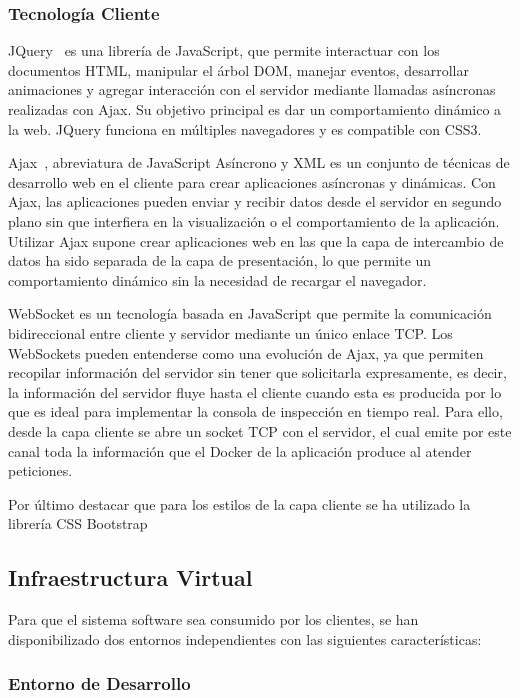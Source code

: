 \documentclass[a4paper,11pt]{book}
\begin{document}
\subsubsection{Tecnología Cliente}


JQuery~\cite{jq} es una librería de JavaScript, que permite interactuar con los documentos HTML, manipular el árbol DOM, manejar eventos, desarrollar animaciones y agregar interacción con el servidor mediante llamadas asíncronas realizadas con Ajax. Su objetivo principal es dar un comportamiento dinámico a la web. JQuery funciona en múltiples navegadores y es compatible con CSS3.

Ajax~\cite{aj}, abreviatura de JavaScript Asíncrono y XML es un conjunto de técnicas de desarrollo web en el cliente para crear aplicaciones asíncronas y dinámicas. Con Ajax, las aplicaciones pueden enviar y recibir datos desde el servidor en segundo plano sin que interfiera en la visualización o el comportamiento de la aplicación. Utilizar Ajax supone crear aplicaciones web en las que la capa de intercambio de datos ha sido separada de la capa de presentación, lo que permite un comportamiento dinámico sin la necesidad de recargar el navegador.


WebSocket es un tecnología basada en JavaScript que permite la comunicación bidireccional entre cliente y servidor mediante un único enlace TCP. Los WebSockets pueden entenderse como una evolución de Ajax, ya que permiten recopilar información del servidor sin tener que solicitarla expresamente, es decir, la información del servidor fluye hasta el cliente cuando esta es producida por lo que es ideal para implementar la consola de inspección en tiempo real. Para ello, desde la capa cliente se abre un socket TCP con el servidor, el cual emite por este canal toda la información que el Docker de la aplicación produce al atender peticiones.  

Por último destacar que para los estilos de la capa cliente se ha utilizado la librería CSS Bootstrap~\cite{boot}

\subsection{Infraestructura Virtual}\label{iv}

Para que el sistema software sea consumido por los clientes, se han disponibilizado dos entornos independientes con las siguientes características:

\subsubsection{Entorno de Desarrollo}
\end{document}
